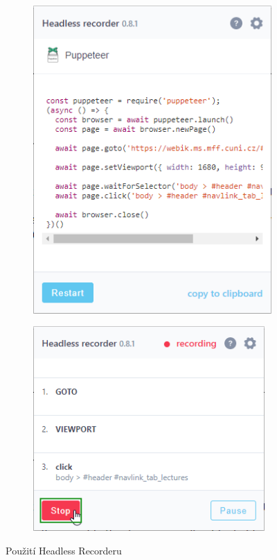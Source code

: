 \documentclass[12pt, a4paper, twoside]{article}
\begin{document}
	\begin{figure}[H]\ContinuedFloat
		\centering
		\begin{subfigure}{0.47\textwidth}
			\includegraphics[width=1\textwidth]{headlessRecorder4.png}
		\end{subfigure}
		\textleftarrow
		\begin{subfigure}{0.47\textwidth}
			\vspace{-3.0cm}
			\includegraphics[width=0.97\textwidth, right]{headlessRecorder3.png}
		\end{subfigure}
		\caption{Použití Headless Recorderu}
	\end{figure}
	\vfill
	\hspace{0pt}
	\newpage
\end{document}
